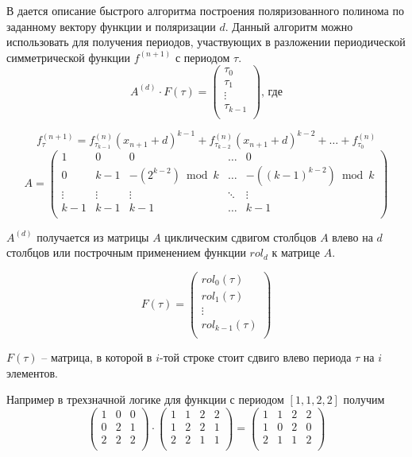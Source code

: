 \documentclass[bibliography=totoc, a4paper, 14pt]{extarticle}
\begin{document}
В \cite{sm09} дается описание быстрого алгоритма построения поляризованного полинома по заданному вектору
функции и поляризации $d$. Данный алгоритм можно использовать для получения периодов, участвующих в разложении
периодической симметрической функции $f^{(n+1)}$ с периодом $\tau$. 
$$A^{(d)} \cdot F(\tau) = \begin{pmatrix}
\tau_0 \\
\tau_1 \\
\vdots \\
\tau_{k-1} \\
\end{pmatrix} \text{, где}
$$

\begin{equation}
\label{deg}
f_{\tau}^{(n+1)} = f_{\tau_{k-1}}^{(n)}(x_{n+1}+d)^{k-1} + f_{\tau_{k-2}}^{(n)}(x_{n+1}+d)^{k-2} + \ldots + f_{\tau_{0}}^{(n)}
\end{equation}
$$
A = \begin{pmatrix}
1      & 0      & 0                  & \ldots & 0                      \\
0      & k-1    & -(2^{k-2}) \bmod k & \ldots & -((k-1)^{k-2}) \bmod k \\
\vdots & \vdots &  \vdots            & \ddots & \vdots                 \\
k-1    & k-1    & k-1                & \ldots & k-1                    \\
\end{pmatrix}
$$

$A^{(d)}$ получается из матрицы $A$ циклическим сдвигом столбцов $A$ влево на $d$ столбцов или построчным применением
функции $rol_d$ к матрице $A$.

$$
F(\tau) = \begin{pmatrix}
rol_0(\tau)     \\
rol_1(\tau)     \\
\vdots          \\
rol_{k-1}(\tau) \\
\end{pmatrix}
$$

$F(\tau)$ -- матрица, в которой в $i$-той строке стоит сдвиго влево периода $\tau$ на $i$ элементов.

Например в трехзначной логике для функции с периодом $[1,1,2,2]$ получим
$$
\begin{pmatrix}
1 & 0 & 0 \\
0 & 2 & 1 \\
2 & 2 & 2 \\
\end{pmatrix}
\cdot
\begin{pmatrix}
1 & 1 & 2 & 2 \\
1 & 2 & 2 & 1 \\
2 & 2 & 1 & 1 \\
\end{pmatrix}
=
\begin{pmatrix}
1 & 1 & 2 & 2 \\
1 & 0 & 2 & 0 \\
2 & 1 & 1 & 2 \\
\end{pmatrix}
$$
\end{document}
